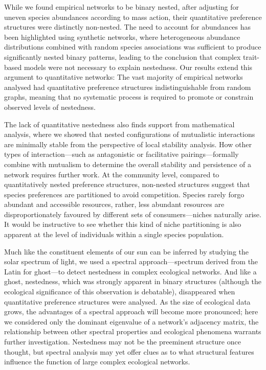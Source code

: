 \documentclass[pdftex]{nature}
\begin{document}
While we found empirical networks to be binary nested, after adjusting
for uneven species abundances according to mass action, their
quantitative preference structures were distinctly non-nested.  The
need to account for abundances has been highlighted using synthetic
networks, where heterogeneous abundance distributions combined with
random species associations was sufficient to produce significantly
nested binary patterns, leading to the conclusion that complex
trait-based models were not necessary to explain
nestedness\cite{Bluthgen2008}.  Our results extend this argument to
quantitative networks: The vast majority of empirical networks
analysed had quantitative preference structures indistinguishable from
random graphs, meaning that no systematic process is required to
promote or constrain observed levels of nestedness.

The lack of quantitative nestedness also finds support from
mathematical analysis, where we showed that nested configurations of
mutualistic interactions are minimally stable from the perspective of
local stability analysis.  How other types of interaction---such as
antagonistic or facilitative pairings\cite{Bastolla2009}---formally
combine with mutualism to determine the overall stability and
persistence of a network requires further work.  At the community
level, compared to quantitatively nested preference structures,
non-nested structures suggest that species preferences are partitioned
to avoid competition.  Species rarely forgo abundant and accessible
resources, rather, less abundant resources are disproportionately
favoured by different sets of consumers---niches naturally arise.  It
would be instructive to see whether this kind of niche partitioning is
also apparent at the level of individuals within a single species
population\cite{Tinker2012}.

Much like the constituent elements of our sun can be inferred by
studying the solar spectrum of light, we used a spectral
approach---spectrum derived from the Latin for ghost---to detect
nestedness in complex ecological networks.  And like a ghost,
nestedness, which was strongly apparent in binary structures (although
the ecological significance of this observation is
debatable\cite{Bluthgen2008}), disappeared when quantitative
preference structures were analysed.  As the size of ecological data
grows, the advantages of a spectral approach will become more
pronounced; here we considered only the dominant eigenvalue of a
network's adjacency matrix, the relationship between other spectral
properties and ecological phenomena warrants further investigation.
Nestedness may not be the preeminent structure once thought, but
spectral analysis may yet offer clues as to what structural features
influence the function of large complex ecological networks.
\end{document}
